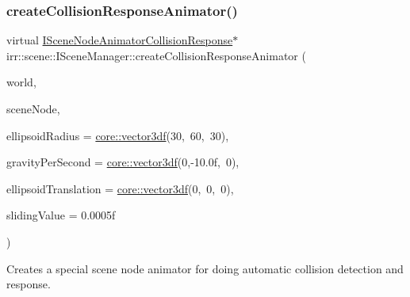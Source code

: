 \subsubsection{\texorpdfstring{create\+Collision\+Response\+Animator()}{createCollisionResponseAnimator()}\hspace{0.1cm}{\footnotesize\ttfamily [1/2]}}
{\footnotesize\ttfamily virtual \hyperlink{classirr_1_1scene_1_1ISceneNodeAnimatorCollisionResponse}{I\+Scene\+Node\+Animator\+Collision\+Response}$\ast$ irr\+::scene\+::\+I\+Scene\+Manager\+::create\+Collision\+Response\+Animator (\begin{DoxyParamCaption}\item[{\hyperlink{classirr_1_1scene_1_1ITriangleSelector}{I\+Triangle\+Selector} $\ast$}]{world,  }\item[{\hyperlink{classirr_1_1scene_1_1ISceneNode}{I\+Scene\+Node} $\ast$}]{scene\+Node,  }\item[{const \hyperlink{namespaceirr_1_1core_ae6e2b2a6c552833ebbd5b7463d03586b}{core\+::vector3df} \&}]{ellipsoid\+Radius = {\ttfamily \hyperlink{namespaceirr_1_1core_ae6e2b2a6c552833ebbd5b7463d03586b}{core\+::vector3df}(30,~60,~30)},  }\item[{const \hyperlink{namespaceirr_1_1core_ae6e2b2a6c552833ebbd5b7463d03586b}{core\+::vector3df} \&}]{gravity\+Per\+Second = {\ttfamily \hyperlink{namespaceirr_1_1core_ae6e2b2a6c552833ebbd5b7463d03586b}{core\+::vector3df}(0,-\/10.0f,~0)},  }\item[{const \hyperlink{namespaceirr_1_1core_ae6e2b2a6c552833ebbd5b7463d03586b}{core\+::vector3df} \&}]{ellipsoid\+Translation = {\ttfamily \hyperlink{namespaceirr_1_1core_ae6e2b2a6c552833ebbd5b7463d03586b}{core\+::vector3df}(0,~0,~0)},  }\item[{\hyperlink{namespaceirr_a0277be98d67dc26ff93b1a6a1d086b07}{f32}}]{sliding\+Value = {\ttfamily 0.0005f} }\end{DoxyParamCaption})\hspace{0.3cm}{\ttfamily [pure virtual]}}



Creates a special scene node animator for doing automatic collision detection and response. 


